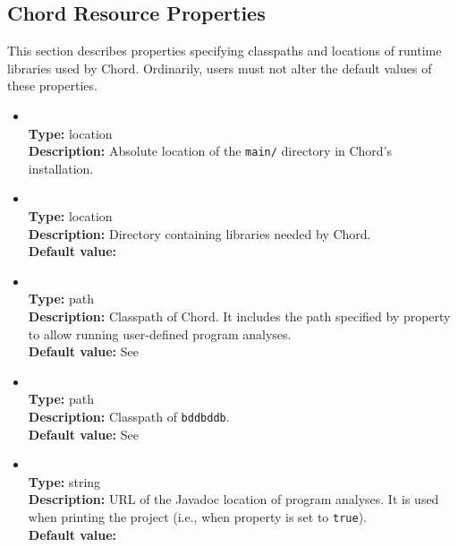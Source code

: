 \subsection{Chord Resource Properties}
\label{sec:chord-sysprops:resource}

This section describes properties specifying classpaths and locations of runtime libraries used by Chord.
Ordinarily, users must not alter the default values of these properties.

\begin{itemize}
\item
{} \\
{\bf Type:} location \\
{\bf Description:} Absolute location of the {\tt main/} directory in Chord's installation.

\item
{} \\
{\bf Type:} location \\
{\bf Description:} Directory containing libraries needed by Chord. \\
{\bf Default value:} 

\item
{} \\
{\bf Type:} path \\
{\bf Description:} Classpath of Chord.  It includes the path specified by property  to allow running user-defined program analyses. \\
{\bf Default value:} See  

\item
{} \\
{\bf Type:} path \\
{\bf Description:} Classpath of {\tt bddbddb}. \\
{\bf Default value:} See  

\item
{} \\
{\bf Type:} string \\
{\bf Description:} URL of the Javadoc location of program analyses.  It is used when printing the project (i.e., when property  is set to {\tt true}). \\
{\bf Default value:} 
\end{itemize}

